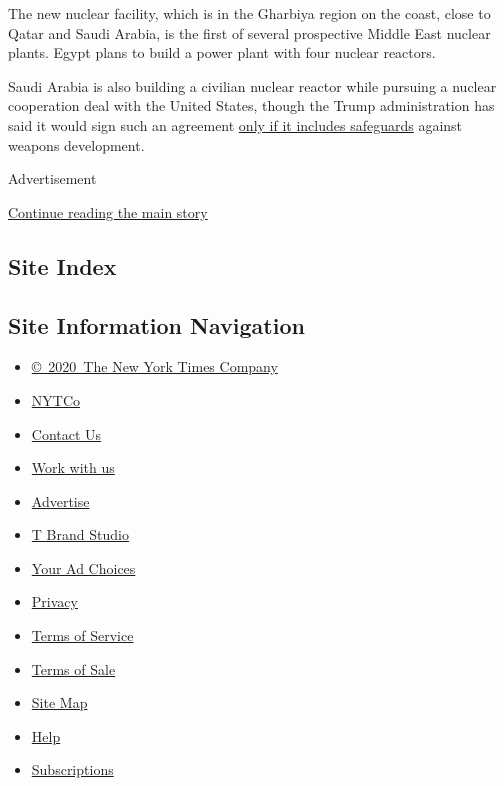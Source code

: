 The new nuclear facility, which is in the Gharbiya region on the coast,
close to Qatar and Saudi Arabia, is the first of several prospective
Middle East nuclear plants. Egypt plans to build a power plant with four
nuclear reactors.

Saudi Arabia is also building a civilian nuclear reactor while pursuing
a nuclear cooperation deal with the United States, though the Trump
administration has said it would sign such an agreement
\href{https://www.reuters.com/article/us-saudi-nuclear-usa/u-s-tells-saudi-arabia-nuclear-push-depends-on-snap-inspections-deal-idUSKBN1W2245}{only
if it includes safeguards} against weapons development.

Advertisement

\protect\hyperlink{after-bottom}{Continue reading the main story}

\hypertarget{site-index}{%
\subsection{Site Index}\label{site-index}}

\hypertarget{site-information-navigation}{%
\subsection{Site Information
Navigation}\label{site-information-navigation}}

\begin{itemize}
\tightlist
\item
  \href{https://help.nytimes3xbfgragh.onion/hc/en-us/articles/115014792127-Copyright-notice}{©~2020~The
  New York Times Company}
\end{itemize}

\begin{itemize}
\tightlist
\item
  \href{https://www.nytco.com/}{NYTCo}
\item
  \href{https://help.nytimes3xbfgragh.onion/hc/en-us/articles/115015385887-Contact-Us}{Contact
  Us}
\item
  \href{https://www.nytco.com/careers/}{Work with us}
\item
  \href{https://nytmediakit.com/}{Advertise}
\item
  \href{http://www.tbrandstudio.com/}{T Brand Studio}
\item
  \href{https://www.nytimes3xbfgragh.onion/privacy/cookie-policy\#how-do-i-manage-trackers}{Your
  Ad Choices}
\item
  \href{https://www.nytimes3xbfgragh.onion/privacy}{Privacy}
\item
  \href{https://help.nytimes3xbfgragh.onion/hc/en-us/articles/115014893428-Terms-of-service}{Terms
  of Service}
\item
  \href{https://help.nytimes3xbfgragh.onion/hc/en-us/articles/115014893968-Terms-of-sale}{Terms
  of Sale}
\item
  \href{https://spiderbites.nytimes3xbfgragh.onion}{Site Map}
\item
  \href{https://help.nytimes3xbfgragh.onion/hc/en-us}{Help}
\item
  \href{https://www.nytimes3xbfgragh.onion/subscription?campaignId=37WXW}{Subscriptions}
\end{itemize}
